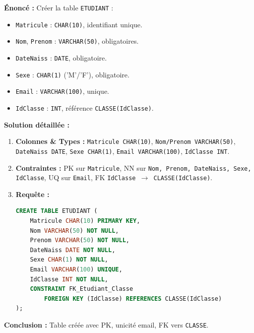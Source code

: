 \documentclass[11pt]{article}
\begin{document}
\begin{exoresolu}
\textbf{Énoncé :} Créer la table \texttt{ETUDIANT} :
\begin{itemize}
    \item \texttt{Matricule} : \texttt{CHAR(10)}, identifiant unique.
    \item \texttt{Nom}, \texttt{Prenom} : \texttt{VARCHAR(50)}, obligatoires.
    \item \texttt{DateNaiss} : \texttt{DATE}, obligatoire.
    \item \texttt{Sexe} : \texttt{CHAR(1)} ('M'/'F'), obligatoire.
    \item \texttt{Email} : \texttt{VARCHAR(100)}, unique.
    \item \texttt{IdClasse} : \texttt{INT}, référence \texttt{CLASSE(IdClasse)}.
\end{itemize}

\tcblower
\textbf{Solution détaillée :}
\begin{enumerate}
    \item \textbf{Colonnes \& Types :} \texttt{Matricule CHAR(10)}, \texttt{Nom/Prenom VARCHAR(50)}, \texttt{DateNaiss DATE}, \texttt{Sexe CHAR(1)}, \texttt{Email VARCHAR(100)}, \texttt{IdClasse INT}.
    \item \textbf{Contraintes :} PK sur \texttt{Matricule}, NN sur \texttt{Nom, Prenom, DateNaiss, Sexe, IdClasse}, UQ sur \texttt{Email}, FK \texttt{IdClasse $\rightarrow$ CLASSE(IdClasse)}.
    \item \textbf{Requête :}
\begin{lstlisting}[language=SQL]
CREATE TABLE ETUDIANT (
    Matricule CHAR(10) PRIMARY KEY,
    Nom VARCHAR(50) NOT NULL,
    Prenom VARCHAR(50) NOT NULL,
    DateNaiss DATE NOT NULL,
    Sexe CHAR(1) NOT NULL,
    Email VARCHAR(100) UNIQUE,
    IdClasse INT NOT NULL,
    CONSTRAINT FK_Etudiant_Classe 
        FOREIGN KEY (IdClasse) REFERENCES CLASSE(IdClasse)
);
\end{lstlisting}
\end{enumerate}
\textbf{Conclusion :} Table créée avec PK, unicité email, FK vers \texttt{CLASSE}.
\end{exoresolu}
\end{document}
